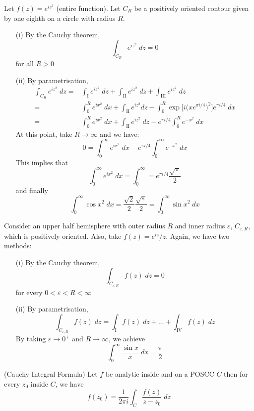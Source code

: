 \begin{ex}
Let $f(z)=e^{iz^2}$ (entire function). Let $C_{R}$ be a positively oriented contour given by one eighth on a circle with radius $R$. 
\begin{itemize}
\item[(i)] By the Cauchy theorem, 
\[\int_{C_{R}}e^{iz^2}\;dz=0\]
for all $R>0$
\item[(ii)] By parametrisation, 
\begin{align*}
\int _{C_{R}}e^{iz^2}\;dz=&\int _{\mathrm{I}}e^{iz^2}\;dz+\int _{\mathrm{II}}e^{iz^2}\;dz+\int _{\mathrm{III}}e^{iz^2}\;dz\\
=&\int _{0}^{R}e^{ix^2}\;dx+\int _{\mathrm{II}}e^{iz^2}dz-\int ^{R}_{0}\exp \Big[i\Big(xe^{\pi i/4}\Big)^2\Big]e^{\pi i/4}\;dx\\
=&\int ^{R}_{0}e^{ix^2}\;dx+\int _{\mathrm{II}}e^{iz^2}\;dz-e^{\pi i/4}\int^{R}_{0}e^{-x^2}\;dx
\end{align*}
At this point, take $R\rightarrow \infty $ and we have:
\[0=\int ^{\infty }_{0}e^{ix^2}\;dx-e^{\pi i/4}\int ^{\infty }_{0}e^{-x^2}\;dx\]
This implies that
\[\int ^{\infty }_{0}e^{ix^2}\;dx=\int ^{\infty }_{0}=e^{\pi i/4}\dfrac{\sqrt{\pi }}{2}\]
and finally
\[\int ^{\infty }_{0}\cos x^2\;dx=\dfrac{\sqrt{2}}{2}\dfrac{\sqrt{\pi }}{2}=\int ^{\infty }_{0}\sin x^2\;dx\]
\end{itemize}
\end{ex}
\vspace{2ex}
\begin{ex}
Consider an upper half hemisphere with outer radius $R$ and inner radius $\varepsilon $, $C_{\varepsilon ,R}$, which is positively oriented. Also, take $f(z)=e^{iz}/z$. Again, we have two methods:
\begin{itemize}
\item[(i)] By the Cauchy theorem,
\[\int _{C_{\varepsilon ,R}}f(z)\;dz=0\]
for every $0<\varepsilon <R<\infty $
\item[(ii)] By parametrisation, 
\[\int _{C_{\varepsilon ,R}}f(z)\;dz=\int _{\mathrm{I}}f(z)\;dz+\ldots +\int _{\mathrm{IV}}f(z)\;dz\]
By taking $\varepsilon \rightarrow 0^{+}$ and $R\rightarrow \infty $, we achieve
\[\int ^{\infty }_{0}\dfrac{\sin x}{x}\;dx=\dfrac{\pi }{2}\]
\end{itemize}
\end{ex}
\vspace{2ex}
\begin{thm}
(Cauchy Integral Formula) Let $f$ be analytic inside and on a POSCC $C$ then for every $z_0$ inside $C$, we have
\[f(z_0)=\dfrac{1}{2\pi i}\int _{C}\dfrac{f(z)}{z-z_0}\;dz\]
\end{thm}
